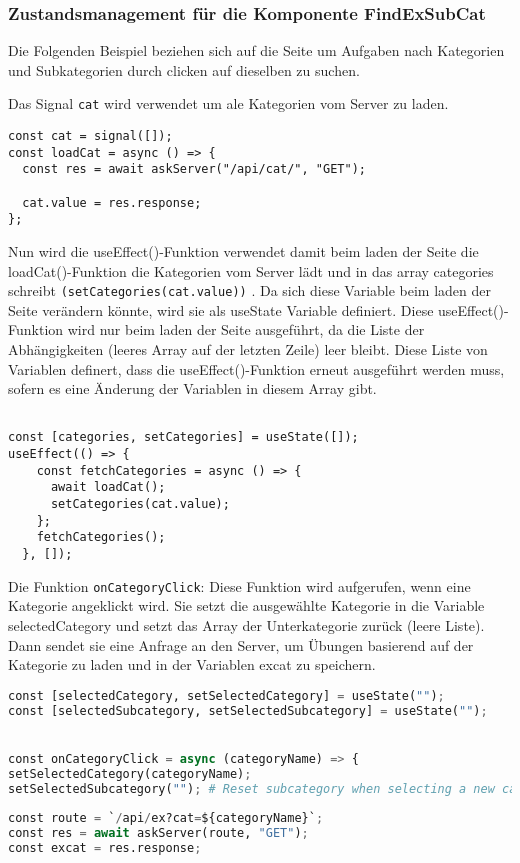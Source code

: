 \documentclass[12pt,a4paper]{scrartcl} %
\begin{document}
\subsubsection{Zustandsmanagement für die Komponente FindExSubCat } 
Die Folgenden Beispiel beziehen sich auf die Seite um Aufgaben nach Kategorien und Subkategorien durch clicken auf dieselben zu suchen.

Das Signal \texttt{cat} wird verwendet um ale Kategorien vom Server zu laden.

\begin{lstlisting}
const cat = signal([]);
const loadCat = async () => {
  const res = await askServer("/api/cat/", "GET");

  cat.value = res.response;
};

\end{lstlisting}

Nun wird die useEffect()-Funktion verwendet damit beim laden der Seite die loadCat()-Funktion die Kategorien vom Server lädt und in das array categories schreibt \texttt{(setCategories(cat.value))} . Da sich diese Variable beim laden der Seite verändern könnte, wird sie als useState Variable definiert. 
Diese useEffect()-Funktion wird nur beim laden der Seite ausgeführt, da die Liste der Abhängigkeiten (leeres Array auf der letzten Zeile) leer bleibt. Diese Liste von Variablen definert, dass die useEffect()-Funktion erneut ausgeführt werden muss, sofern es eine Änderung der Variablen in diesem Array gibt.
\begin{lstlisting}

const [categories, setCategories] = useState([]);
useEffect(() => {
    const fetchCategories = async () => {
      await loadCat();
      setCategories(cat.value);
    };
    fetchCategories();
  }, []);

\end{lstlisting}


Die Funktion \texttt{onCategoryClick}: Diese Funktion wird aufgerufen, wenn eine Kategorie angeklickt wird. Sie setzt die ausgewählte Kategorie in die Variable selectedCategory und setzt das Array der Unterkategorie zurück (leere Liste). Dann sendet sie eine Anfrage an den Server, um Übungen basierend auf der Kategorie zu laden und in der Variablen excat zu speichern.

\begin{lstlisting}[language=Python]
const [selectedCategory, setSelectedCategory] = useState("");
const [selectedSubcategory, setSelectedSubcategory] = useState("");


const onCategoryClick = async (categoryName) => {
setSelectedCategory(categoryName);
setSelectedSubcategory(""); # Reset subcategory when selecting a new category
    
const route = `/api/ex?cat=${categoryName}`;
const res = await askServer(route, "GET");
const excat = res.response;
    
\end{lstlisting}
\end{document}
